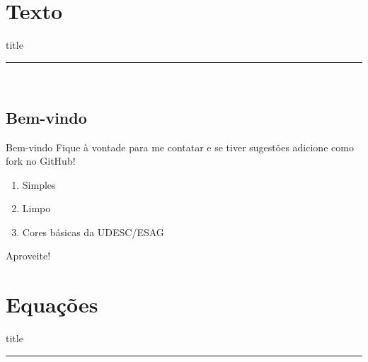 \section{Texto}
\begin{frame}[plain]
    \vfill
    \centering
    \begin{beamercolorbox}[sep=8pt,center,shadow=true,rounded=true]{title}
        \insertsectionhead\par %
        \color{oxfordblue}\noindent\rule{10cm}{1pt} \\ %
        \LARGE{\faFileTextO} %
    \end{beamercolorbox}
    \vfill
\end{frame}

\subsection{Bem-vindo}
\begin{frame}{Bem-vindo}
    Fique à vontade para me contatar e se tiver sugestões adicione como fork no GitHub! \href{https://github.com/Schadenlord/slide-esag}{\faGithub} %

    \begin{enumerate}
        \item Simples
        \item Limpo
        \item Cores básicas da UDESC/ESAG %
    \end{enumerate}
    \vspace{1cm}
    \begin{center}
        Aproveite! \faSmileO %
    \end{center}
\end{frame}

\section{Equações}
\begin{frame}[plain]
    \vfill
    \centering
    \begin{beamercolorbox}[sep=8pt,center,shadow=true,rounded=true]{title}
        \insertsectionhead\par %
        \color{oxfordblue}\noindent\rule{10cm}{1pt} \\ %
        \LARGE{\faFileTextO} %
    \end{beamercolorbox}
    \vfill
\end{frame}

